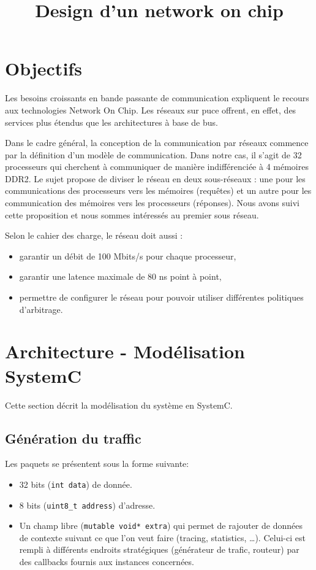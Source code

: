 \documentclass[11pt]{article}
\title{Design d'un network on chip}
\begin{document}
\maketitle

\section{Objectifs}

Les besoins croissants en bande passante de communication expliquent le recours
aux technologies Network On Chip. Les réseaux sur puce offrent, en effet, des
services plus étendus que les architectures à base de bus.


Dans le cadre général, la conception de la communication par réseaux commence
par la définition d'un modèle de communication. Dans notre cas, il s'agit de 32
processeurs qui cherchent à communiquer de manière indifférenciée à 4 mémoires
DDR2. Le sujet propose de diviser le réseau en deux sous-réseaux : une pour les
communications des processeurs vers les mémoires (requêtes) et un autre pour les
communication des mémoires vers les processeurs (réponses). Nous avons suivi
cette proposition et nous sommes intéressés au premier sous réseau.


Selon le cahier des charge, le réseau doit aussi :
\begin{itemize}
  \item garantir un débit de 100 Mbits/s pour chaque processeur,
  \item garantir une latence maximale de 80 ns point à point,
  \item permettre de configurer le réseau pour pouvoir utiliser différentes
    politiques d'arbitrage.
\end{itemize}

\section{Architecture - Modélisation SystemC}

Cette section décrit la modélisation du système en SystemC.

\subsection{Génération du traffic}

Les paquets se présentent sous la forme suivante:
\begin{itemize}
  \item 32 bits (\texttt{int data}) de donnée.
  \item 8 bits (\texttt{uint8\_t address}) d'adresse.
  \item Un champ libre (\texttt{mutable void* extra}) qui permet de rajouter de
    données de contexte suivant ce que l'on veut faire (tracing, statistics,
    \ldots). Celui-ci est rempli à différents endroits stratégiques
    (générateur de trafic, routeur) par des callbacks fournis aux instances
    concernées.
\end{itemize}
\end{document}
